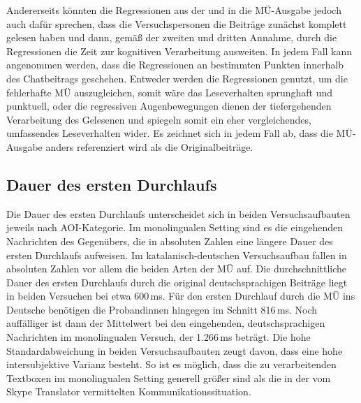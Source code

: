Andererseits könnten die Regressionen aus der und in die MÜ-Ausgabe jedoch auch dafür sprechen, dass die Versuchspersonen die Beiträge zunächst komplett gelesen haben und dann, gemäß der zweiten und dritten Annahme, durch die Regressionen die Zeit zur kognitiven Verarbeitung ausweiten. In jedem Fall kann angenommen werden, dass die Regressionen an bestimmten Punkten innerhalb des Chatbeitrags geschehen. Entweder werden die Regressionen genutzt, um die fehlerhafte MÜ auszugleichen, somit wäre das Leseverhalten sprunghaft und punktuell, oder die regressiven Augenbewegungen dienen der tiefergehenden Verarbeitung des Gelesenen und spiegeln somit ein eher vergleichendes, umfassendes Leseverhalten wider. Es zeichnet sich in jedem Fall ab, dass die MÜ-Ausgabe anders referenziert wird als die Originalbeiträge.




\subsection{Dauer des ersten Durchlaufs}
\label{K7:subsec:IAFRD}


Die Dauer des ersten Durchlaufs unterscheidet sich in beiden Versuchsaufbauten jeweils nach AOI-Kategorie. Im monolingualen Setting sind es die eingehenden Nachrichten des Gegenübers, die in absoluten Zahlen eine längere Dauer des ersten Durchlaufs aufweisen. Im katalanisch-deutschen Versuchsaufbau fallen in absoluten Zahlen vor allem die beiden Arten der MÜ auf. Die durchschnittliche Dauer des ersten Durchlaufs durch die original deutschsprachigen Beiträge liegt in beiden Versuchen bei etwa 600\,ms. Für den ersten Durchlauf durch die MÜ ins Deutsche benötigen die Proband{\textperiodcentered}innen hingegen im Schnitt 816\,ms. Noch auffälliger ist dann der Mittelwert bei den eingehenden, deutschsprachigen Nachrichten im monolingualen Versuch, der 1.266\,ms beträgt. Die hohe Standardabweichung in beiden Versuchsaufbauten zeugt davon, dass eine hohe intersubjektive Varianz besteht. So ist es möglich, dass die zu verarbeitenden Textboxen im monolingualen Setting generell größer sind als die in der vom Skype Translator vermittelten Kommunikationssituation.

